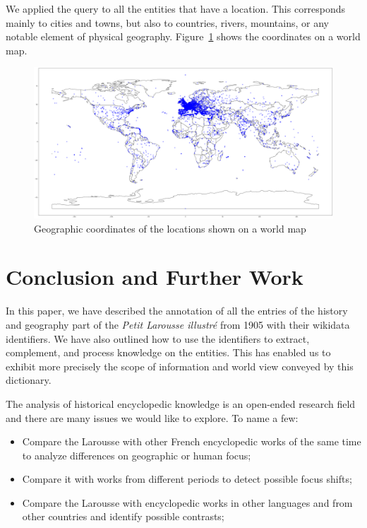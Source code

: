 \documentclass[10pt, a4paper]{article}
\begin{document}
We applied the query to all the entities that have a location. This corresponds mainly to cities and towns, but also to countries, rivers, mountains, or any notable element of physical geography. Figure~\ref{fig:villes} shows the coordinates on a world map.

\begin{figure}[t]
\centering
\includegraphics[width=\textwidth]{img/villes.png} 
\caption{Geographic coordinates of the locations shown on a world map}
\label{fig:villes}
\end{figure}

\section{Conclusion and Further Work}
In this paper, we have described the annotation of all the entries of the history and geography part of the \textit{Petit Larousse illustré} from 1905 with their wikidata identifiers. We have also outlined how to use the identifiers to extract, complement, and process knowledge on the entities. This has enabled us to exhibit more precisely the scope of information and world view conveyed by this dictionary.

The analysis of historical encyclopedic knowledge is an open-ended research field and there are many issues we would like to explore. To name a few:
\begin{itemize}
    \item Compare the Larousse with other French encyclopedic works of the same time to analyze differences on geographic or human focus;
    \item Compare it with works from different periods to detect possible focus shifts;
    \item Compare the Larousse with encyclopedic works in other languages and from other countries and identify possible contrasts;
\end{itemize}
\end{document}
